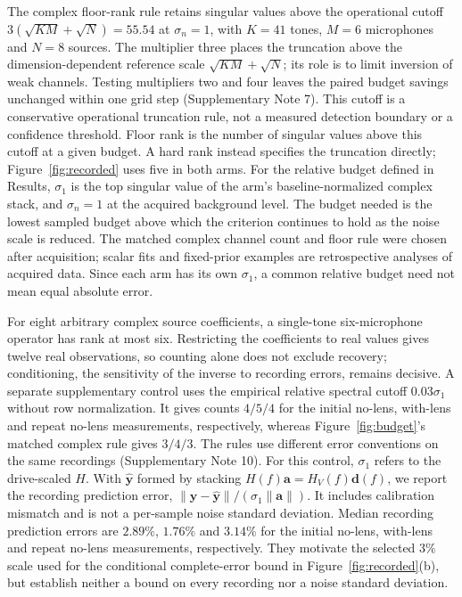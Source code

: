 \documentclass[lineno,pdflatex,sn-nature]{sn-jnl}%
\theoremstyle{thmstyleone}%
\theoremstyle{thmstyletwo}%
\theoremstyle{thmstylethree}%
\begin{document}
The complex floor-rank rule retains singular values above the operational cutoff $3(\sqrt{KM}+\sqrt N)=55.54$ at $\sigma_n=1$, with $K=41$ tones, $M=6$ microphones and $N=8$ sources. The multiplier three places the truncation above the dimension-dependent reference scale $\sqrt{KM}+\sqrt N$; its role is to limit inversion of weak channels. Testing multipliers two and four leaves the paired budget savings unchanged within one grid step (Supplementary Note 7). This cutoff is a conservative operational truncation rule, not a measured detection boundary or a confidence threshold. Floor rank is the number of singular values above this cutoff at a given budget. A hard rank instead specifies the truncation directly; Figure~\ref{fig:recorded} uses five in both arms. For the relative budget defined in Results, $\sigma_1$ is the top singular value of the arm's baseline-normalized complex stack, and $\sigma_n=1$ at the acquired background level. The budget needed is the lowest sampled budget above which the criterion continues to hold as the noise scale is reduced. The matched complex channel count and floor rule were chosen after acquisition; scalar fits and fixed-prior examples are retrospective analyses of acquired data. Since each arm has its own $\sigma_1$, a common relative budget need not mean equal absolute error.


For eight arbitrary complex source coefficients, a single-tone six-microphone operator has rank at most six. Restricting the coefficients to real values gives twelve real observations, so counting alone does not exclude recovery; conditioning, the sensitivity of the inverse to recording errors, remains decisive. A separate supplementary control uses the empirical relative spectral cutoff $0.03\sigma_1$ without row normalization. It gives counts $4/5/4$ for the initial no-lens, with-lens and repeat no-lens measurements, respectively, whereas Figure~\ref{fig:budget}'s matched complex rule gives $3/4/3$. The rules use different error conventions on the same recordings (Supplementary Note 10). For this control, $\sigma_1$ refers to the drive-scaled $H$. With $\hat{\mathbf y}$ formed by stacking $H(f)\mathbf a=H_V(f)\mathbf d(f)$, we report the recording prediction error, $\|\mathbf y-\hat{\mathbf y}\|/(\sigma_1\|\mathbf a\|)$. It includes calibration mismatch and is not a per-sample noise standard deviation. Median recording prediction errors are $2.89\%$, $1.76\%$ and $3.14\%$ for the initial no-lens, with-lens and repeat no-lens measurements, respectively. They motivate the selected $3\%$ scale used for the conditional complete-error bound in Figure~\ref{fig:recorded}(b), but establish neither a bound on every recording nor a noise standard deviation.
\end{document}
